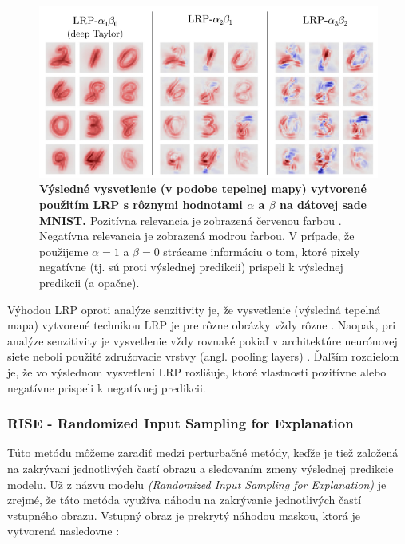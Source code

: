 \begin{figure}[h!]
\centering
\includegraphics[scale=0.5]{assets/images/lrp.png}
\caption{\textbf{Výsledné vysvetlenie (v podobe tepelnej mapy) vytvorené použitím LRP s rôznymi hodnotami $\alpha$ a $\beta$ na dátovej sade MNIST. \cite{montavon2018methods}} Pozitívna relevancia je zobrazená červenou farbou . \cite{montavon2018methods} Negatívna relevancia je zobrazená modrou farbou. \cite{montavon2018methods} V prípade, že použijeme $\alpha = 1$ a $\beta = 0$ strácame informáciu o tom, ktoré pixely negatívne (tj. sú proti výslednej predikcii) prispeli k výslednej predikcii (a opačne).}
\label{fig:lrp}
\end{figure}

Výhodou LRP oproti analýze senzitivity je, že vysvetlenie (výsledná tepelná mapa) vytvorené technikou LRP je pre rôzne obrázky vždy rôzne \cite{Muller_Samek_Montavon_Lapuschkin_Arras}. Naopak, pri analýze senzitivity je vysvetlenie vždy rovnaké pokiaľ v architektúre neurónovej siete neboli použité združovacie vrstvy (angl. pooling layers) \cite{Muller_Samek_Montavon_Lapuschkin_Arras}. Ďaľším rozdielom je, že vo výslednom vysvetlení LRP rozlišuje, ktoré vlastnosti pozitívne alebo negatívne prispeli k negatívnej predikcii.


\subsubsection{RISE - Randomized Input Sampling for Explanation \label{sec:rise}}

Túto metódu môžeme zaradiť medzi perturbačné metódy, keďže je tiež založená na zakrývaní jednotlivých častí obrazu a sledovaním zmeny výslednej predikcie modelu. Už z názvu modelu \textit{(Randomized Input Sampling for Explanation)} je zrejmé, že táto metóda využíva náhodu na zakrývanie jednotlivých častí vstupného obrazu. Vstupný obraz je prekrytý náhodou maskou, ktorá je vytvorená nasledovne \cite{petsiuk2018rise}:

